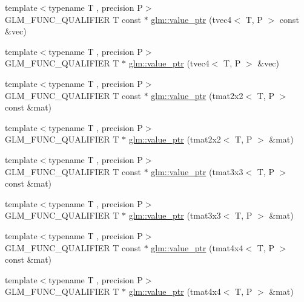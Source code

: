 \begin{DoxyCompactItemize}
\item 
{\footnotesize template$<$typename T , precision P$>$ }\\G\-L\-M\-\_\-\-F\-U\-N\-C\-\_\-\-Q\-U\-A\-L\-I\-F\-I\-E\-R T const $\ast$ \hyperlink{group__gtc__type__ptr_gaf641bc0e28d4b274826b9afed315d310}{glm\-::value\-\_\-ptr} (tvec4$<$ T, P $>$ const \&vec)
\item 
{\footnotesize template$<$typename T , precision P$>$ }\\G\-L\-M\-\_\-\-F\-U\-N\-C\-\_\-\-Q\-U\-A\-L\-I\-F\-I\-E\-R T $\ast$ \hyperlink{group__gtc__type__ptr_ga4c19763f3c5991b9dc88a3ffdd9ea6cd}{glm\-::value\-\_\-ptr} (tvec4$<$ T, P $>$ \&vec)
\item 
{\footnotesize template$<$typename T , precision P$>$ }\\G\-L\-M\-\_\-\-F\-U\-N\-C\-\_\-\-Q\-U\-A\-L\-I\-F\-I\-E\-R T const $\ast$ \hyperlink{group__gtc__type__ptr_ga2d709523aa0beb0a42433f80c9d07718}{glm\-::value\-\_\-ptr} (tmat2x2$<$ T, P $>$ const \&mat)
\item 
{\footnotesize template$<$typename T , precision P$>$ }\\G\-L\-M\-\_\-\-F\-U\-N\-C\-\_\-\-Q\-U\-A\-L\-I\-F\-I\-E\-R T $\ast$ \hyperlink{group__gtc__type__ptr_gac7256e14328e818e61276fa5e6176b9d}{glm\-::value\-\_\-ptr} (tmat2x2$<$ T, P $>$ \&mat)
\item 
{\footnotesize template$<$typename T , precision P$>$ }\\G\-L\-M\-\_\-\-F\-U\-N\-C\-\_\-\-Q\-U\-A\-L\-I\-F\-I\-E\-R T const $\ast$ \hyperlink{group__gtc__type__ptr_ga0fd20ac385befba86cf2bbf836728bc2}{glm\-::value\-\_\-ptr} (tmat3x3$<$ T, P $>$ const \&mat)
\item 
{\footnotesize template$<$typename T , precision P$>$ }\\G\-L\-M\-\_\-\-F\-U\-N\-C\-\_\-\-Q\-U\-A\-L\-I\-F\-I\-E\-R T $\ast$ \hyperlink{group__gtc__type__ptr_ga4470e16d0e844cb2c4f7b2e731824f87}{glm\-::value\-\_\-ptr} (tmat3x3$<$ T, P $>$ \&mat)
\item 
{\footnotesize template$<$typename T , precision P$>$ }\\G\-L\-M\-\_\-\-F\-U\-N\-C\-\_\-\-Q\-U\-A\-L\-I\-F\-I\-E\-R T const $\ast$ \hyperlink{group__gtc__type__ptr_ga2edadf5433694bf018d62db962b61321}{glm\-::value\-\_\-ptr} (tmat4x4$<$ T, P $>$ const \&mat)
\item 
{\footnotesize template$<$typename T , precision P$>$ }\\G\-L\-M\-\_\-\-F\-U\-N\-C\-\_\-\-Q\-U\-A\-L\-I\-F\-I\-E\-R T $\ast$ \hyperlink{group__gtc__type__ptr_ga1fc49ab60e5afdd4821a6903e92244a4}{glm\-::value\-\_\-ptr} (tmat4x4$<$ T, P $>$ \&mat)

\end{DoxyCompactItemize}
